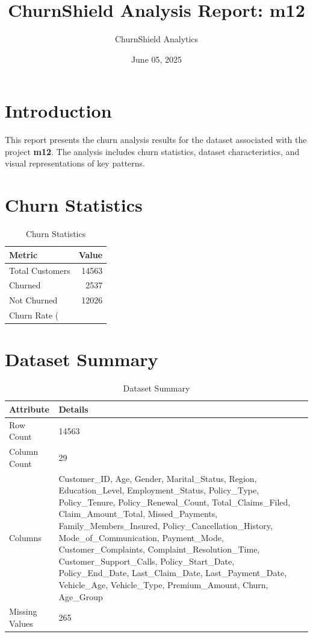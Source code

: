 \documentclass[a4paper,12pt]{article}
\begin{document}
\title{ChurnShield Analysis Report: m12}
\author{ChurnShield Analytics}
\date{ June 05, 2025 }
\maketitle

\section{Introduction}
This report presents the churn analysis results for the dataset associated with the project \textbf{m12}. The analysis includes churn statistics, dataset characteristics, and visual representations of key patterns.

\section{Churn Statistics}
\begin{table}[h]
\centering
\begin{tabular}{lr}
\toprule
Metric & Value \\
\midrule
Total Customers & 14563 \\
Churned & 2537 \\
Not Churned & 12026 \\
Churn Rate (%
\bottomrule
\end{tabular}
\caption{Churn Statistics}
\label{tab:churn_stats}
\end{table}

\section{Dataset Summary}
\begin{table}[h]
\centering
\begin{tabular}{ll}
\toprule
Attribute & Details \\
\midrule
Row Count & 14563 \\
Column Count & 29 \\
Columns & Customer_ID, Age, Gender, Marital_Status, Region, Education_Level, Employment_Status, Policy_Type, Policy_Tenure, Policy_Renewal_Count, Total_Claims_Filed, Claim_Amount_Total, Missed_Payments, Family_Members_Insured, Policy_Cancellation_History, Mode_of_Communication, Payment_Mode, Customer_Complaints, Complaint_Resolution_Time, Customer_Support_Calls, Policy_Start_Date, Policy_End_Date, Last_Claim_Date, Last_Payment_Date, Vehicle_Age, Vehicle_Type, Premium_Amount, Churn, Age_Group \\
Missing Values & 265 \\
\bottomrule
\end{tabular}
\caption{Dataset Summary}
\label{tab:dataset_summary}
\end{table}
\end{document}
